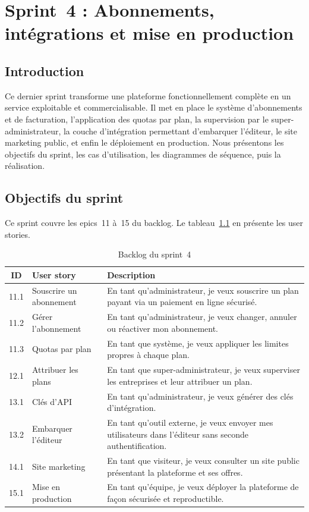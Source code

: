 \chapter{Sprint~4 : Abonnements, intégrations et mise en production}
\label{chap:sprint4}

\section*{Introduction}
Ce dernier sprint transforme une plateforme fonctionnellement complète en un
service exploitable et commercialisable. Il met en place le système
d'abonnements et de facturation, l'application des quotas par plan, la
supervision par le super-administrateur, la couche d'intégration permettant
d'embarquer l'éditeur, le site marketing public, et enfin le déploiement en
production. Nous présentons les objectifs du sprint, les cas d'utilisation,
les diagrammes de séquence, puis la réalisation.

\section{Objectifs du sprint}
Ce sprint couvre les epics~11 à~15 du backlog. Le
tableau~\ref{tab:backlog-s4} en présente les user stories.

\begin{table}[H]
\centering
\caption{Backlog du sprint~4}
\label{tab:backlog-s4}
\small
\begin{tabularx}{\linewidth}{clX}
\toprule
\textbf{ID} & \textbf{User story} & \textbf{Description} \\
\midrule
11.1 & Souscrire un abonnement & En tant qu'administrateur, je veux souscrire un plan payant via un paiement en ligne sécurisé. \\
11.2 & Gérer l'abonnement & En tant qu'administrateur, je veux changer, annuler ou réactiver mon abonnement. \\
11.3 & Quotas par plan & En tant que système, je veux appliquer les limites propres à chaque plan. \\
12.1 & Attribuer les plans & En tant que super-administrateur, je veux superviser les entreprises et leur attribuer un plan. \\
13.1 & Clés d'API & En tant qu'administrateur, je veux générer des clés d'intégration. \\
13.2 & Embarquer l'éditeur & En tant qu'outil externe, je veux envoyer mes utilisateurs dans l'éditeur sans seconde authentification. \\
14.1 & Site marketing & En tant que visiteur, je veux consulter un site public présentant la plateforme et ses offres. \\
15.1 & Mise en production & En tant qu'équipe, je veux déployer la plateforme de façon sécurisée et reproductible. \\
\bottomrule
\end{tabularx}
\end{table}

